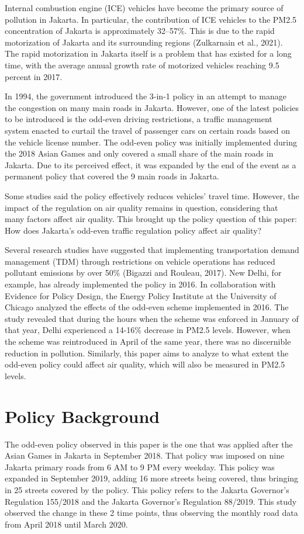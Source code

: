 \documentclass[AEJ]{AEA}
\begin{document}
Internal combustion engine (ICE) vehicles have become the primary source of pollution in Jakarta. In particular, the contribution of ICE vehicles to the PM2.5 concentration of Jakarta is approximately 32--57\%. This is due to the rapid motorization of Jakarta and its surrounding regions (Zulkarnain et al., 2021). The rapid motorization in Jakarta itself is a problem that has existed for a long time, with the average annual growth rate of motorized vehicles reaching 9.5 percent in 2017. 

In 1994, the government introduced the 3-in-1 policy in an attempt to manage the congestion on many main roads in  Jakarta. However, one of the latest policies to be introduced is the odd-even driving restrictions, a traffic management system enacted to curtail the travel of passenger cars on certain roads based on the vehicle license number. The odd-even policy was initially implemented during the 2018 Asian Games and only covered a small share of the main roads in Jakarta. Due to its perceived effect, it was expanded by the end of the event as a permanent policy that covered the 9 main roads in  Jakarta.

Some studies said the policy effectively reduces vehicles' travel time. However, the impact of the regulation on air quality remains in question, considering that many factors affect air quality. This brought up the policy question of this paper: How does Jakarta's odd-even traffic regulation policy affect air quality?

Several research studies have suggested that implementing transportation demand management (TDM) through restrictions on vehicle operations has reduced pollutant emissions by over 50\% (Bigazzi and Rouleau, 2017). New Delhi, for example, has already implemented the policy in 2016. In collaboration with Evidence for Policy Design, the Energy Policy Institute at the University of Chicago analyzed the effects of the odd-even scheme implemented in 2016. The study revealed that during the hours when the scheme was enforced in January of that year, Delhi experienced a 14-16\% decrease in PM2.5 levels. However, when the scheme was reintroduced in April of the same year, there was no discernible reduction in pollution. Similarly, this paper aims to analyze to what extent the odd-even policy could affect air quality, which will also be measured in PM2.5 levels.

\section{Policy Background}
The odd-even policy observed in this paper is the one that was applied after the Asian Games in Jakarta in September 2018. That policy was imposed on nine Jakarta primary roads from 6 AM to 9 PM every weekday. This policy was expanded in September 2019, adding 16 more streets being covered, thus bringing in 25 streets covered by the policy. This policy refers to the  Jakarta Governor's Regulation 155/2018 and the  Jakarta Governor's Regulation 88/2019. This study observed the change in these 2 time points, thus observing the monthly road data from April 2018 until March 2020.
\end{document}

